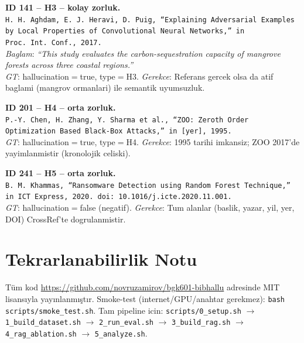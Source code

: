 \documentclass[11pt,a4paper]{article}
\begin{document}
\medskip
\noindent\textbf{ID 141 -- H3 -- kolay zorluk.}\\
\texttt{H.~H.~Aghdam, E.~J.~Heravi, D.~Puig, ``Explaining Adversarial Examples by Local Properties of Convolutional Neural Networks,'' in Proc.\ Int.\ Conf., 2017.}\\
\textit{Baglam}: \emph{``This study evaluates the carbon-sequestration capacity of mangrove forests across three coastal regions.''}\\
\textit{GT}: hallucination$=$true, type$=$H3.
\textit{Gerekce}: Referans gercek olsa da atif baglami (mangrov ormanlari)
ile semantik uyumsuzluk.

\medskip
\noindent\textbf{ID 201 -- H4 -- orta zorluk.}\\
\texttt{P.-Y.~Chen, H.~Zhang, Y.~Sharma et al., ``ZOO: Zeroth Order Optimization Based Black-Box Attacks,'' in [yer], 1995.}\\
\textit{GT}: hallucination$=$true, type$=$H4.
\textit{Gerekce}: 1995 tarihi imkansiz; ZOO 2017'de yayimlanmistir
(kronolojik celiski).

\medskip
\noindent\textbf{ID 241 -- H5 -- orta zorluk.}\\
\texttt{B.~M.~Khammas, ``Ransomware Detection using Random Forest Technique,'' in ICT Express, 2020. doi: 10.1016/j.icte.2020.11.001.}\\
\textit{GT}: hallucination$=$false (negatif).
\textit{Gerekce}: Tum alanlar (baslik, yazar, yil, yer, DOI) CrossRef'te
dogrulanmistir.

\section{Tekrarlanabilirlik Notu}
\label{appx:repro}
Tüm kod \url{https://github.com/novruzamirov/bgk601-bibhallu} adresinde MIT
lisansıyla yayınlanmıştır. Smoke-test (internet/GPU/anahtar gerekmez):
\texttt{bash scripts/smoke\_test.sh}. Tam pipeline icin:
\texttt{scripts/0\_setup.sh} $\to$ \texttt{1\_build\_dataset.sh} $\to$
\texttt{2\_run\_eval.sh} $\to$ \texttt{3\_build\_rag.sh} $\to$
\texttt{4\_rag\_ablation.sh} $\to$ \texttt{5\_analyze.sh}.
\end{document}

